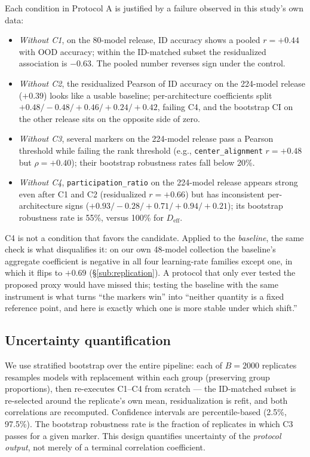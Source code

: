 \documentclass[10pt]{article} %
\newcommand{\srcref}[1]{\S\ref{#1}}
\begin{document}
Each condition in Protocol A is justified by a failure observed in this study's own data:

\begin{itemize}
\item \emph{Without C1}, on the 80-model release, ID accuracy shows a pooled $r = +0.44$ with OOD accuracy; within the ID-matched subset the residualized association is $-0.63$. The pooled number reverses sign under the control.
\item \emph{Without C2}, the residualized Pearson of ID accuracy on the 224-model release ($+0.39$) looks like a usable baseline; per-architecture coefficients split $+0.48 / -0.48 / +0.46 / +0.24 / +0.42$, failing C4, and the bootstrap CI on the other release sits on the opposite side of zero.
\item \emph{Without C3}, several markers on the 224-model release pass a Pearson threshold while failing the rank threshold (e.g., \texttt{center\_alignment} $r=+0.48$ but $\rho=+0.40$); their bootstrap robustness rates fall below 20\%.
\item \emph{Without C4}, \texttt{participation\_ratio} on the 224-model release appears strong even after C1 and C2 (residualized $r=+0.66$) but has inconsistent per-architecture signs ($+0.93/-0.28/+0.71/+0.94/+0.21$); its bootstrap robustness rate is 55\%, versus 100\% for $D_{\mathrm{eff}}$.
\end{itemize}

C4 is not a condition that favors the candidate. Applied to the \emph{baseline}, the same check is what disqualifies it: on our own 48-model collection the baseline's aggregate coefficient is negative in all four learning-rate families except one, in which it flips to $+0.69$ (\srcref{sub:replication}). A protocol that only ever tested the proposed proxy would have missed this; testing the baseline with the same instrument is what turns ``the markers win'' into ``neither quantity is a fixed reference point, and here is exactly which one is more stable under which shift.''

\subsection{Uncertainty quantification}
\label{sub:uncertainty}

We use stratified bootstrap over the entire pipeline: each of $B=2000$ replicates resamples models with replacement within each group (preserving group proportions), then re-executes C1--C4 from scratch --- the ID-matched subset is re-selected around the replicate's own mean, residualization is refit, and both correlations are recomputed. Confidence intervals are percentile-based (2.5\%, 97.5\%). The bootstrap robustness rate is the fraction of replicates in which C3 passes for a given marker. This design quantifies uncertainty of the \emph{protocol output}, not merely of a terminal correlation coefficient.
\end{document}
